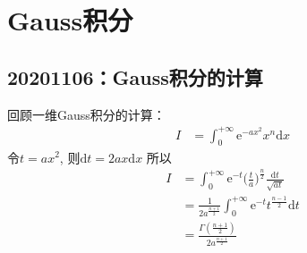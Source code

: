 \chapter{Gauss积分}
    \section{20201106：Gauss积分的计算}
        回顾一维Gauss积分的计算：
        \begin{equation}\begin{aligned}
            I &= \int_0^{+\infty} \mathrm{e}^{-ax^2} x^{n} \mathrm{d}x
        \end{aligned}\end{equation}
        令$t = ax^2$, 则$\mathrm{d}t = 2ax\mathrm{d}x$
        所以
        \begin{equation}\begin{aligned}
        I &= \int_0^{+\infty} \mathrm{e}^{-t} \bigg(\frac ta\bigg)^{\frac n2} \frac {\mathrm{d}t}{\sqrt{at}}\\
        &= \frac 1{2a^{\frac {n+1}2}} \int_0^{+\infty} \mathrm{e}^{-t} t^{\frac {n-1}2} \mathrm{d}t\\
        &= \frac {\Gamma(\frac {n+1}2)}{2a^{\frac {n+1}2}}
        \end{aligned}\end{equation}


